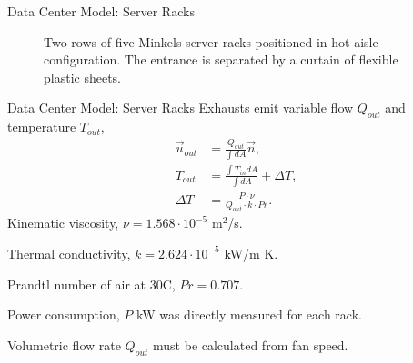 \documentclass{beamer}
\begin{document}
\begin{frame}{Data Center Model: Server Racks}
\begin{figure}[!htb]
\centering
\begin{tiny} %
\def\svgwidth{1.05\linewidth}

\end{tiny}
\caption{Two rows of five Minkels server racks positioned in hot aisle configuration. The entrance is separated by a curtain of flexible plastic sheets.}
\label{fig:racks}
\end{figure}
\end{frame}

\begin{frame}{Data Center Model: Server Racks}
Exhausts emit variable flow $Q_{out}$ and temperature $T_{out}$,
\begin{align}
\vec{u}_{out} &= \frac{Q_{out}}{\int dA} \vec{n},\\
T_{out} &= \frac{\int T_{in} dA}{\int dA} + \Delta T,\\
\Delta T &= \frac{P \cdot \nu}{Q_{out} \cdot k \cdot Pr}.
\end{align}
Kinematic viscosity, $\nu = 1.568\cdot10^{-5}$ m$^2$/s.

Thermal conductivity, $k=2.624\cdot10^{-5}$ kW/m K.

Prandtl number of air at 30\degree C, $Pr = 0.707$.

Power consumption, $P$ kW was directly measured for each rack.

Volumetric flow rate $Q_{out}$ must be calculated from fan speed.
\end{frame}
\end{document}
